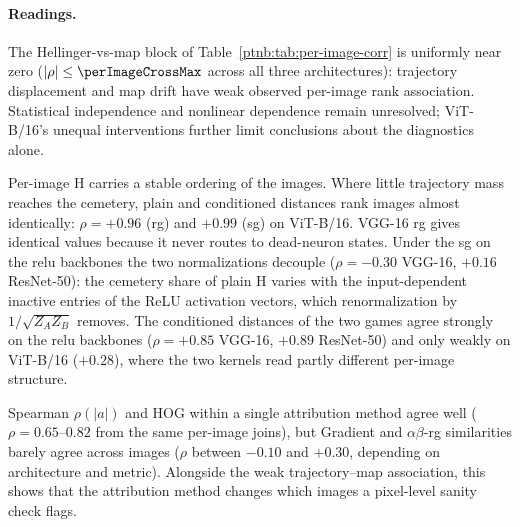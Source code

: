 \begin{table}[H]
\TableContent{
    \centering
    \scriptsize
    \setlength{\tabcolsep}{3.5pt}
    
    }%
\caption[Per-image Spearman rank correlations]{Per-image Spearman rank correlations across the $\perImageN$-image ImageNet-S test split
    at the selected cascading steps of the Hellinger and attribution-sanity pipelines. The randomized
    layers match on the CNNs; the ViT-B/16 attribution cascade additionally randomizes $Q$, $K$, and $V$.  Left block:
    within-Hellinger cross-correlations of the plain ($\mathrm{H}_{\cdot,\mathrm{pl}}$) and
    survival-conditioned ($\mathrm{H}_{\cdot,\mathrm{surv}}$) distances under the \ac{rg} and \ac{sg}
    kernels (self-entries shown as $-$; trivially $+1$).  Right block: Hellinger-vs-map
    cross-correlations.}
    \label{ptnb:tab:per-image-corr}
\end{table}

\paragraph{Readings.}
The Hellinger-vs-map block of Table~\ref{ptnb:tab:per-image-corr} is uniformly near zero ($|\rho| \leq \perImageCrossMax$ across all three architectures): trajectory displacement and map drift have weak observed per-image rank association. Statistical independence and nonlinear dependence remain unresolved; ViT-B/16's unequal interventions further limit conclusions about the diagnostics alone.

Per-image $\mathrm{H}$ carries a stable ordering of the images. Where little trajectory mass reaches the cemetery, plain and conditioned distances rank images almost identically: $\rho = +0.96$ (\ac{rg}) and $+0.99$ (\ac{sg}) on ViT-B/16. VGG-16 \ac{rg} gives identical values because it never routes to dead-neuron states. Under the \ac{sg} on the \ac{relu} backbones the two normalizations decouple ($\rho = -0.30$ VGG-16, $+0.16$ ResNet-50): the cemetery share of plain $\mathrm{H}$ varies with the input-dependent inactive entries of the ReLU activation vectors, which renormalization by $1/\sqrt{Z_A Z_B}$ removes. The conditioned distances of the two games agree strongly on the \ac{relu} backbones ($\rho = +0.85$ VGG-16, $+0.89$ ResNet-50) and only weakly on ViT-B/16 ($+0.28$), where the two kernels read partly different per-image structure.

Spearman $\rho(|a|)$ and HOG within a single attribution method agree well ($\rho=0.65$--$0.82$ from the same per-image joins), but Gradient and $\alpha\beta$-\ac{rg} similarities barely agree across images ($\rho$ between $-0.10$ and $+0.30$, depending on architecture and metric). Alongside the weak trajectory--map association, this shows that the attribution method changes which images a pixel-level sanity check flags.
\par\medskip
\providecommand{\nValGrid}{\textcolor{red}{??}}%

